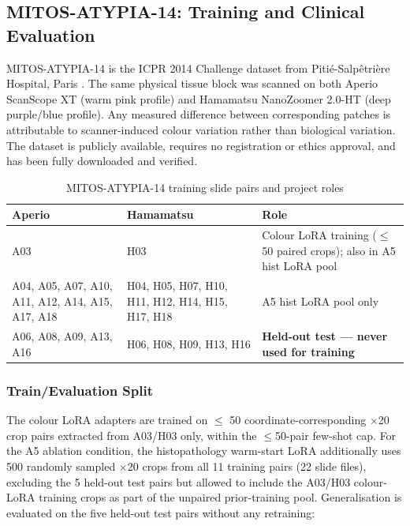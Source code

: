 \documentclass[a4paper,twoside,12pt]{report}
\begin{document}
\subsection{MITOS-ATYPIA-14: Training and Clinical Evaluation}

MITOS-ATYPIA-14 is the ICPR 2014 Challenge dataset from Pitié-Salpêtrière Hospital, Paris \citep{roux2014mitos}. The same physical tissue block was scanned on both Aperio ScanScope XT (warm pink profile) and Hamamatsu NanoZoomer 2.0-HT (deep purple/blue profile). Any measured difference between corresponding patches is attributable to scanner-induced colour variation rather than biological variation. The dataset is publicly available, requires no registration or ethics approval, and has been fully downloaded and verified.

\begin{table}[ht]
\centering
\small
\setlength{\tabcolsep}{3pt}
\caption{MITOS-ATYPIA-14 training slide pairs and project roles}
\label{tab:mitos_roles}
\begin{tabularx}{\textwidth}{L{0.22\textwidth}L{0.27\textwidth}Y}
\toprule
\textbf{Aperio} & \textbf{Hamamatsu} & \textbf{Role} \\
\midrule
A03 & H03 & Colour LoRA training ($\leq$ 50 paired crops); also in A5 hist LoRA pool \\
A04, A05, A07, A10, A11, A12, A14, A15, A17, A18 & H04, H05, H07, H10, H11, H12, H14, H15, H17, H18 & A5 hist LoRA pool only \\
\midrule
A06, A08, A09, A13, A16 & H06, H08, H09, H13, H16 & \textbf{Held-out test --- never used for training} \\
\bottomrule
\end{tabularx}
\end{table}

\subsubsection{Train/Evaluation Split}

The colour LoRA adapters are trained on $\leq$ 50 coordinate-corresponding $\times$20 crop pairs extracted from A03/H03 only, within the $\leq$50-pair few-shot cap. For the A5 ablation condition, the histopathology warm-start LoRA additionally uses 500 randomly sampled $\times$20 crops from all 11 training pairs (22 slide files), excluding the 5 held-out test pairs but allowed to include the A03/H03 colour-LoRA training crops as part of the unpaired prior-training pool. Generalisation is evaluated on the five held-out test pairs without any retraining:
\end{document}
